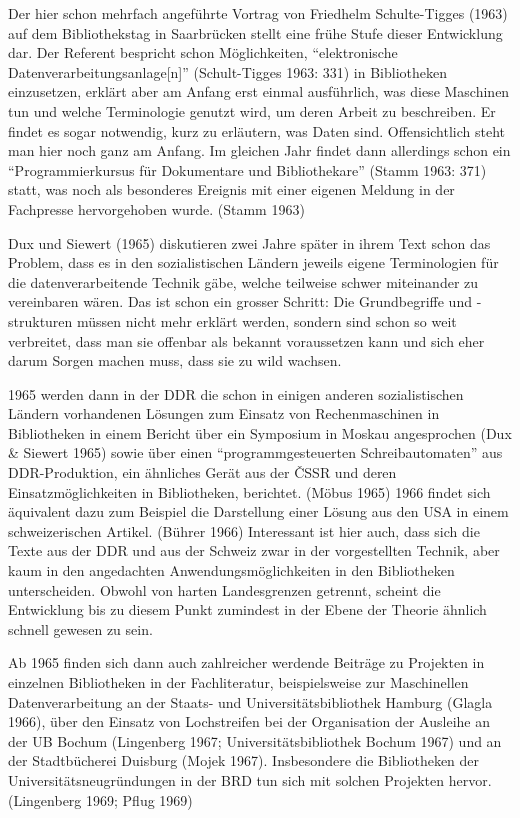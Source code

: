 \documentclass[a4paper,
fontsize=11pt,
oneside,
numbers=noperiodatend,
parskip=half-,
bibliography=totoc,
final
]{scrartcl}
\begin{document}
Der hier schon mehrfach angeführte Vortrag von Friedhelm Schulte-Tigges
(1963) auf dem Bibliothekstag in Saarbrücken stellt eine frühe Stufe
dieser Entwicklung dar. Der Referent bespricht schon Möglichkeiten,
\enquote{elektronische Datenverarbeitungsanlage{[}n{]}} (Schult-Tigges 1963:
331) in Bibliotheken einzusetzen, erklärt aber am Anfang erst einmal
ausführlich, was diese Maschinen tun und welche Terminologie genutzt
wird, um deren Arbeit zu beschreiben. Er findet es sogar notwendig, kurz
zu erläutern, was Daten sind. Offensichtlich steht man hier noch ganz am
Anfang. Im gleichen Jahr findet dann allerdings schon ein
\enquote{Programmierkursus für Dokumentare und Bibliothekare} (Stamm 1963: 371)
statt, was noch als besonderes Ereignis mit einer eigenen Meldung in der
Fachpresse hervorgehoben wurde. (Stamm 1963)

Dux und Siewert (1965) diskutieren zwei Jahre später in ihrem Text schon
das Problem, dass es in den sozialistischen Ländern jeweils eigene
Terminologien für die datenverarbeitende Technik gäbe, welche teilweise
schwer miteinander zu vereinbaren wären. Das ist schon ein grosser
Schritt: Die Grundbegriffe und -strukturen müssen nicht mehr erklärt
werden, sondern sind schon so weit verbreitet, dass man sie offenbar als
bekannt voraussetzen kann und sich eher darum Sorgen machen muss, dass
sie zu wild wachsen.

1965 werden dann in der DDR die schon in einigen anderen sozialistischen
Ländern vorhandenen Lösungen zum Einsatz von Rechenmaschinen in
Bibliotheken in einem Bericht über ein Symposium in Moskau angesprochen
(Dux \& Siewert 1965) sowie über einen \enquote{programmgesteuerten
Schreibautomaten} aus DDR-Produktion, ein ähnliches Gerät aus der ČSSR
und deren Einsatzmöglichkeiten in Bibliotheken, berichtet. (Möbus 1965)
1966 findet sich äquivalent dazu zum Beispiel die Darstellung einer
Lösung aus den USA in einem schweizerischen Artikel. (Bührer 1966)
Interessant ist hier auch, dass sich die Texte aus der DDR und aus der
Schweiz zwar in der vorgestellten Technik, aber kaum in den angedachten
Anwendungsmöglichkeiten in den Bibliotheken unterscheiden. Obwohl von
harten Landesgrenzen getrennt, scheint die Entwicklung bis zu diesem
Punkt zumindest in der Ebene der Theorie ähnlich schnell gewesen zu
sein.

Ab 1965 finden sich dann auch zahlreicher werdende Beiträge zu Projekten
in einzelnen Bibliotheken in der Fachliteratur, beispielsweise zur
Maschinellen Datenverarbeitung an der Staats- und Universitätsbibliothek
Hamburg (Glagla 1966), über den Einsatz von Lochstreifen bei der
Organisation der Ausleihe an der UB Bochum (Lingenberg 1967;
Universitätsbibliothek Bochum 1967) und an der Stadtbücherei Duisburg
(Mojek 1967). Insbesondere die Bibliotheken der
Universitätsneugründungen in der BRD tun sich mit solchen Projekten
hervor. (Lingenberg 1969; Pflug 1969)
\end{document}
